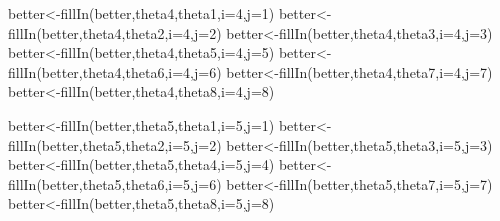 \documentclass[
]{book}
\newenvironment{Shaded}{\begin{snugshade}}{\end{snugshade}}
\newcommand{\AttributeTok}[1]{\textcolor[rgb]{0.77,0.63,0.00}{#1}}
\newcommand{\DecValTok}[1]{\textcolor[rgb]{0.00,0.00,0.81}{#1}}
\newcommand{\FunctionTok}[1]{\textcolor[rgb]{0.00,0.00,0.00}{#1}}
\newcommand{\NormalTok}[1]{#1}
\newcommand{\OtherTok}[1]{\textcolor[rgb]{0.56,0.35,0.01}{#1}}
\theoremstyle{definition}
\theoremstyle{definition}
\theoremstyle{definition}
\theoremstyle{definition}
\theoremstyle{remark}
\begin{document}
\begin{Shaded}
\begin{Highlighting}[]
\NormalTok{  better}\OtherTok{\textless{}{-}}\FunctionTok{fillIn}\NormalTok{(better,theta4,theta1,}\AttributeTok{i=}\DecValTok{4}\NormalTok{,}\AttributeTok{j=}\DecValTok{1}\NormalTok{)}
\NormalTok{  better}\OtherTok{\textless{}{-}}\FunctionTok{fillIn}\NormalTok{(better,theta4,theta2,}\AttributeTok{i=}\DecValTok{4}\NormalTok{,}\AttributeTok{j=}\DecValTok{2}\NormalTok{)}
\NormalTok{  better}\OtherTok{\textless{}{-}}\FunctionTok{fillIn}\NormalTok{(better,theta4,theta3,}\AttributeTok{i=}\DecValTok{4}\NormalTok{,}\AttributeTok{j=}\DecValTok{3}\NormalTok{)}
\NormalTok{  better}\OtherTok{\textless{}{-}}\FunctionTok{fillIn}\NormalTok{(better,theta4,theta5,}\AttributeTok{i=}\DecValTok{4}\NormalTok{,}\AttributeTok{j=}\DecValTok{5}\NormalTok{)}
\NormalTok{  better}\OtherTok{\textless{}{-}}\FunctionTok{fillIn}\NormalTok{(better,theta4,theta6,}\AttributeTok{i=}\DecValTok{4}\NormalTok{,}\AttributeTok{j=}\DecValTok{6}\NormalTok{)}
\NormalTok{  better}\OtherTok{\textless{}{-}}\FunctionTok{fillIn}\NormalTok{(better,theta4,theta7,}\AttributeTok{i=}\DecValTok{4}\NormalTok{,}\AttributeTok{j=}\DecValTok{7}\NormalTok{)}
\NormalTok{  better}\OtherTok{\textless{}{-}}\FunctionTok{fillIn}\NormalTok{(better,theta4,theta8,}\AttributeTok{i=}\DecValTok{4}\NormalTok{,}\AttributeTok{j=}\DecValTok{8}\NormalTok{)}
  
\NormalTok{   better}\OtherTok{\textless{}{-}}\FunctionTok{fillIn}\NormalTok{(better,theta5,theta1,}\AttributeTok{i=}\DecValTok{5}\NormalTok{,}\AttributeTok{j=}\DecValTok{1}\NormalTok{)}
\NormalTok{  better}\OtherTok{\textless{}{-}}\FunctionTok{fillIn}\NormalTok{(better,theta5,theta2,}\AttributeTok{i=}\DecValTok{5}\NormalTok{,}\AttributeTok{j=}\DecValTok{2}\NormalTok{)}
\NormalTok{  better}\OtherTok{\textless{}{-}}\FunctionTok{fillIn}\NormalTok{(better,theta5,theta3,}\AttributeTok{i=}\DecValTok{5}\NormalTok{,}\AttributeTok{j=}\DecValTok{3}\NormalTok{)}
\NormalTok{  better}\OtherTok{\textless{}{-}}\FunctionTok{fillIn}\NormalTok{(better,theta5,theta4,}\AttributeTok{i=}\DecValTok{5}\NormalTok{,}\AttributeTok{j=}\DecValTok{4}\NormalTok{)}
\NormalTok{  better}\OtherTok{\textless{}{-}}\FunctionTok{fillIn}\NormalTok{(better,theta5,theta6,}\AttributeTok{i=}\DecValTok{5}\NormalTok{,}\AttributeTok{j=}\DecValTok{6}\NormalTok{)}
\NormalTok{  better}\OtherTok{\textless{}{-}}\FunctionTok{fillIn}\NormalTok{(better,theta5,theta7,}\AttributeTok{i=}\DecValTok{5}\NormalTok{,}\AttributeTok{j=}\DecValTok{7}\NormalTok{)}
\NormalTok{  better}\OtherTok{\textless{}{-}}\FunctionTok{fillIn}\NormalTok{(better,theta5,theta8,}\AttributeTok{i=}\DecValTok{5}\NormalTok{,}\AttributeTok{j=}\DecValTok{8}\NormalTok{)}
  

\end{Highlighting}
\end{Shaded}
\end{document}
